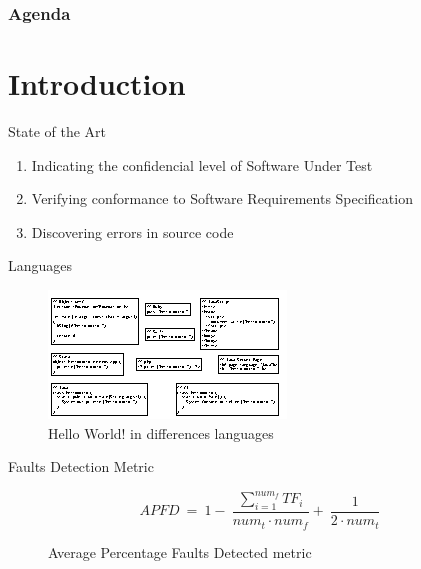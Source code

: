 \documentclass{beamer}
\title{\ThesisNameEN}
\subtitle{IMECS2017}
\date[2017.03.14]{\today}
\author{\authorNameEN~\small{and~\advisorEn}}
\institute{{\facultyEn}, {\universityEn}}
\begin{document}
\maketitle

\begin{frame}[t]
    \frametitle{Agenda}
    \tableofcontents[hideallsubsections]
\end{frame}

%
\section{Introduction}
\begin{frame}{State of the Art}
  \begin{enumerate}
     \item Indicating the confidencial level of Software Under Test
     \item Verifying conformance to Software Requirements Specification
     \item Discovering errors in source code
  \end{enumerate}
\end{frame}

\begin{frame}{Languages}
  \begin{figure}
    \includegraphics[width=.9\paperwidth]{figure/hello-world-lang}
    \caption{Hello World! in differences languages}
    \label{fig:helloworld}
  \end{figure}
\end{frame}

\begin{frame}{Faults Detection Metric}
    \begin{figure}
        \begin{equation}
            APFD~=~1-~\frac{\sum^{num_f}_{i=1}{TF_i}}{{num}_t \cdot {num}_f} %
                    +~\frac{1}{2 \cdot {num}_t}
            \label{eq:apfd}
        \end{equation}
        \caption{Average Percentage Faults Detected metric \parencite{792604}}
        \label{fig:apfd}
    \end{figure}
\end{frame}
\end{document}
